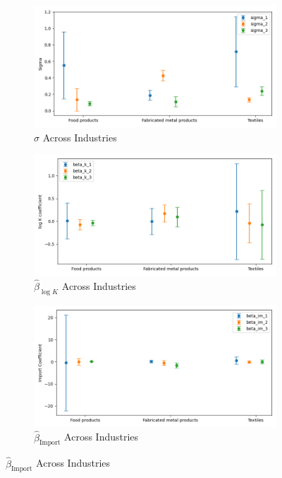 \documentclass{article}
\begin{document}
\begin{figure}[ht!]
    \begin{subfigure}[t]{0.32\textwidth}
        \centering
        \includegraphics[width=\textwidth]{figure/stationary_mixture_kmshare_ciiu_sigma_across_industries_m3.png}
        \caption{$\hat\sigma$ Across Industries}
    \end{subfigure}
    \begin{subfigure}[t]{0.32\textwidth}
        \centering
        \includegraphics[width=\textwidth]{figure/stationary_mixture_kmshare_ciiu_beta_k_across_industries_m3.png}
        \caption{$\hat{\beta}_{\log K}$ Across Industries}
    \end{subfigure}
    \begin{subfigure}[t]{0.32\textwidth}
        \centering
        \includegraphics[width=\textwidth]{figure/stationary_mixture_kmshare_ciiu_beta_im_across_industries_m3.png}
        \caption{$\hat{\beta}_{\text{Import}}$ Across Industries}
    \end{subfigure}
\end{figure}
\end{document}
